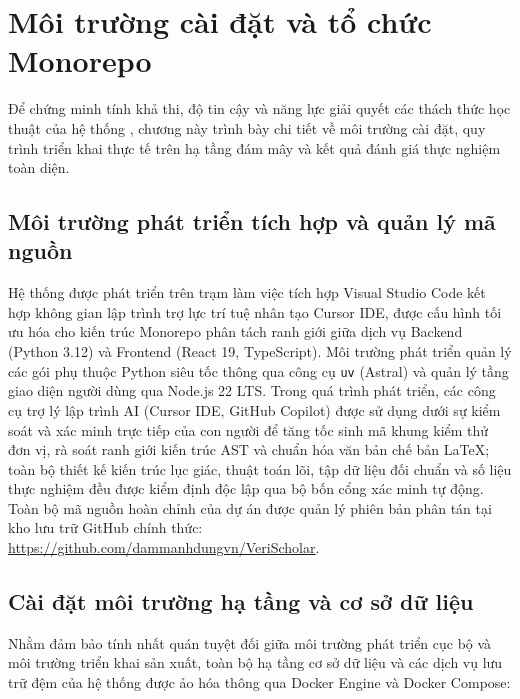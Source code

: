 \section{Môi trường cài đặt và tổ chức Monorepo}
\label{sec:moi_truong}

Để chứng minh tính khả thi, độ tin cậy và năng lực giải quyết các thách thức học thuật của hệ thống \VS, chương này trình bày chi tiết về môi trường cài đặt, quy trình triển khai thực tế trên hạ tầng đám mây và kết quả đánh giá thực nghiệm toàn diện.

\subsection{Môi trường phát triển tích hợp và quản lý mã nguồn}
\label{subsec:cai_dat_vscode}

Hệ thống \VS được phát triển trên trạm làm việc tích hợp Visual Studio Code kết hợp không gian lập trình trợ lực trí tuệ nhân tạo Cursor IDE, được cấu hình tối ưu hóa cho kiến trúc Monorepo phân tách ranh giới giữa dịch vụ Backend (Python 3.12) và Frontend (React 19, TypeScript). Môi trường phát triển quản lý các gói phụ thuộc Python siêu tốc thông qua công cụ \texttt{uv} (Astral) và quản lý tầng giao diện người dùng qua Node.js 22 LTS. Trong quá trình phát triển, các công cụ trợ lý lập trình AI (Cursor IDE, GitHub Copilot) được sử dụng dưới sự kiểm soát và xác minh trực tiếp của con người để tăng tốc sinh mã khung kiểm thử đơn vị, rà soát ranh giới kiến trúc AST và chuẩn hóa văn bản chế bản LaTeX; toàn bộ thiết kế kiến trúc lục giác, thuật toán lõi, tập dữ liệu đối chuẩn và số liệu thực nghiệm đều được kiểm định độc lập qua bộ bốn cổng xác minh tự động. Toàn bộ mã nguồn hoàn chỉnh của dự án được quản lý phiên bản phân tán tại kho lưu trữ GitHub chính thức: \url{https://github.com/dammanhdungvn/VeriScholar}.

\subsection{Cài đặt môi trường hạ tầng và cơ sở dữ liệu}
\label{subsec:cai_dat_ha_tang}

Nhằm đảm bảo tính nhất quán tuyệt đối giữa môi trường phát triển cục bộ và môi trường triển khai sản xuất, toàn bộ hạ tầng cơ sở dữ liệu và các dịch vụ lưu trữ đệm của hệ thống được ảo hóa thông qua Docker Engine và Docker Compose:

